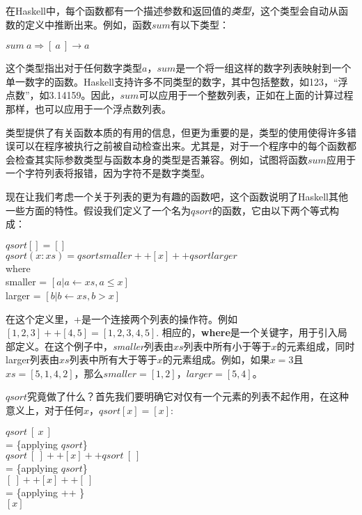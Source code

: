在Haskell中，每个函数都有一个描述参数和返回值的\textit{类型}，这个类型会自动从函数的定义中推断出来。例如，函数$sum$有以下类型：

\noindent\hspace*{1cm} $sum ~a \Rightarrow [~a~] \rightarrow a$

这个类型指出对于任何数字类型$a$，$sum$是一个将一组这样的数字列表映射到一个单一数字的函数。Haskell支持许多不同类型的数字，其中包括整数，如123，“浮点数”，如3.14159。因此，$sum$可以应用于一个整数列表，正如在上面的计算过程那样，也可以应用于一个浮点数列表。

类型提供了有关函数本质的有用的信息，但更为重要的是，类型的使用使得许多错误可以在程序被执行之前被自动检查出来。尤其是，对于一个程序中的每个函数都会检查其实际参数类型与函数本身的类型是否兼容。例如，试图将函数$sum$应用于一个字符列表将报错，因为字符不是数字类型。

现在让我们考虑一个关于列表的更为有趣的函数吧，这个函数说明了Haskell其他一些方面的特性。假设我们定义了一个名为$qsort$的函数，它由以下两个等式构成：

\hspace*{1cm} $qsort [] = []$\\
\hspace*{1cm} $qsort (x : xs) = qsort smaller ++ [x] ++ qsort larger$\\
\hspace*{3cm}                  where\\
\hspace*{4cm}                     smaller = $[a | a \leftarrow xs, a ≤ x ]$\\
\hspace*{4cm}                     larger = $[b | b \leftarrow xs, b > x ]$

在这个定义里，+是一个连接两个列表的操作符。例如$[1, 2, 3] ++ [4, 5] = [1, 2, 3, 4, 5]$.
相应的，\textbf{where}是一个关键字，用于引入局部定义。在这个例子中，\textit{smaller}列表由$xs$列表中所有小于等于$x$的元素组成，同时larger列表由$xs$列表中所有大于等于$x$的元素组成。例如，如果$x
= 3$且$xs = [ 5, 1, 4, 2]$，那么$smaller = [1, 2]$，$larger = [5, 4]$。

$qsort$究竟做了什么？首先我们要明确它对仅有一个元素的列表不起作用，在这种意义上，对于任何$x$，$qsort [x] = [x]$:

\noindent\hspace*{1cm} $qsort~[~x~]$\\
\hspace*{1cm} = \{applying $qsort$\}\\
\hspace*{1cm} $qsort~[~] ++ [x] ++ qsort~[~]$\\
\hspace*{1cm} = \{applying $qsort$\}\\
\hspace*{1cm} $[~] ++ [x] ++ [~]$\\
\hspace*{1cm} = \{applying ++ \}\\
\hspace*{1cm} $[x]$

